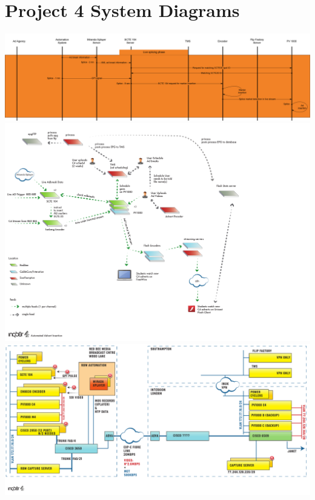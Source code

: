 \section{Project 4 System Diagrams}
\includegraphics[angle=90,scale=0.2]{resources/P4_Event_Flow.png}
\newpage
\includegraphics[scale=0.35]{resources/P4_System_Overview.pdf}
\newpage
\includegraphics[angle=90,scale=0.55]{resources/P4_Server_Config.pdf}